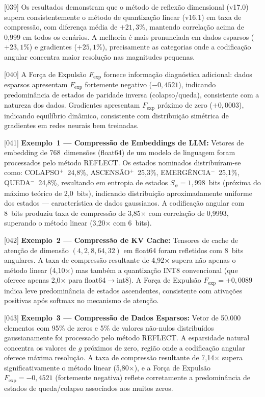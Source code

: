\documentclass[12pt,a4paper]{article}
\newcommand{\Fexp}{F_{\text{exp}}}
\begin{document}
{[039]} Os resultados demonstram que o método de reflexão
dimensional (v17.0) supera consistentemente o método de
quantização linear (v16.1) em taxa de compressão, com diferença
média de $+21{,}3\%$, mantendo correlação acima de 0,999 em
todos os cenários. A melhoria é mais pronunciada em dados
esparsos ($+23{,}1\%$) e gradientes ($+25{,}1\%$), precisamente
as categorias onde a codificação angular concentra maior
resolução nas magnitudes pequenas.

{[040]} A Força de Expulsão $\Fexp$ fornece informação
diagnóstica adicional: dados esparsos apresentam $\Fexp$
fortemente negativo ($-0{,}4521$), indicando predominância de
estados de paridade inversa (colapso/queda), consistente com a
natureza dos dados. Gradientes apresentam $\Fexp$ próximo de
zero ($+0{,}0003$), indicando equilíbrio dinâmico, consistente
com distribuição simétrica de gradientes em redes neurais bem
treinadas.

{[041]} \textbf{Exemplo~1 --- Compressão de Embeddings de LLM:}
Vetores de embedding de 768~dimensões (float64) de um modelo de
linguagem foram processados pelo método REFLECT. Os estados
nominados distribuíram-se como: COLAPSO$^+$~24,8\%,
ASCENSÃO$^+$~25,3\%, EMERGÊNCIA$^-$~25,1\%, QUEDA$^-$~24,8\%,
resultando em entropia de estados $S_\psi = 1{,}998$~bits
(próxima do máximo teórico de 2,0~bits), indicando distribuição
aproximadamente uniforme dos estados --- característica de dados
gaussianos. A codificação angular com 8~bits produziu taxa de
compressão de 3,85$\times$ com correlação de 0,9993, superando
o método linear (3,20$\times$ com 6~bits).

{[042]} \textbf{Exemplo~2 --- Compressão de KV Cache:} Tensores
de cache de atenção de dimensão $(4, 2, 8, 64, 32)$ em float64
foram refletidos com 8~bits angulares. A taxa de compressão
resultante de 4,92$\times$ supera não apenas o método linear
(4,10$\times$) mas também a quantização INT8 convencional (que
oferece apenas 2,0$\times$ para float64$\to$int8). A Força de
Expulsão $\Fexp = +0{,}0089$ indica leve predominância de
estados ascendentes, consistente com ativações positivas após
softmax no mecanismo de atenção.

{[043]} \textbf{Exemplo~3 --- Compressão de Dados Esparsos:}
Vetor de 50.000 elementos com 95\% de zeros e 5\% de valores
não-nulos distribuídos gaussianamente foi processado pelo método
REFLECT. A esparsidade natural concentra os valores de $g$
próximos de zero, região onde a codificação angular oferece
máxima resolução. A taxa de compressão resultante de
7,14$\times$ supera significativamente o método linear
(5,80$\times$), e a Força de Expulsão $\Fexp = -0{,}4521$
(fortemente negativa) reflete corretamente a predominância de
estados de queda/colapso associados aos muitos zeros.
\end{document}
